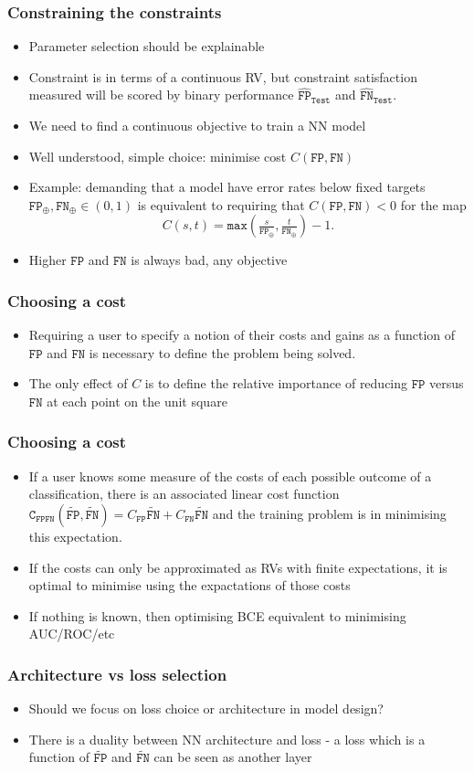 \documentclass{beamer}
\newcommand{\UC}{{\texttt{C}_{\texttt{FPFN}}}}
\newcommand{\TST}{{\texttt{Test}}}
\newcommand{\FP}{{\texttt{FP}}}
\newcommand{\FN}{{\texttt{FN}}}
\newcommand{\FPE}{{\widehat{\texttt{FP}}}}
\newcommand{\FNE}{{\widehat{\texttt{FN}}}}
\newcommand{\Fp}{\widetilde{\texttt{FP}}}
\newcommand{\Fn}{\widetilde{\texttt{FN}}}
\newcommand{\FPT}{{\texttt{FP}_\oplus}}
\newcommand{\FNT}{{\texttt{FN}_\oplus}}
\begin{document}
\begin{frame}
\frametitle{Constraining the constraints}
\begin{itemize}
\item
  Parameter selection should be explainable
\item
  Constraint is in terms of a continuous RV, but constraint satisfaction measured will be scored by binary performance $\FPE_\TST$ and $\FNE_\TST$.
\item
  We need to find a continuous objective to train a NN model
\item
  Well understood, simple choice: minimise cost $C(\FP,\FN)$
\item
  Example: demanding that a model have error rates below fixed targets $\FPT,\FNT\in(0,1)$ is equivalent to requiring that $C(\FP,\FN)<0$ for the map
  $$
    C(s,t)=\texttt{max}(\tfrac s{\FPT},\tfrac t{\FNT})-1.
  $$
\item
  Higher $\FP$ and $\FN$ is always bad, any objective
\end{itemize}
\end{frame}
\begin{frame}
\frametitle{Choosing a cost}
\begin{itemize}
\item
  Requiring a user to specify a notion of their costs and gains as a function of $\FP$ and $\FN$ is necessary to define the problem being solved.
  \item
    The only effect of $C$ is to define the relative importance of reducing $\FP$ versus $\FN$ at each point on the unit square
\end{itemize}
\end{frame}
\begin{frame}
\frametitle{Choosing a cost}
\begin{itemize}
  \item
    If a user knows some measure of the costs of each possible outcome of a classification, there is an associated linear cost function $\UC(\Fp,\Fn)=C_\FP\Fn+C_\FN\Fn$ and the training problem is in minimising this expectation.
  \item
    If the costs can only be approximated as RVs with finite expectations, it is optimal to minimise using the expactations of those costs
  \item
    If nothing is known, then optimising BCE equivalent to minimising AUC/ROC/etc
\end{itemize}
\end{frame}
\begin{frame}
\frametitle{Architecture vs loss selection}
\begin{itemize}
  \item
    Should we focus on loss choice or architecture in model design?
  \item
    There is a duality between NN architecture and loss - a loss which is a function of $\Fp$ and $\Fn$ can be seen as another layer
\end{itemize}
\end{frame}
\end{document}
